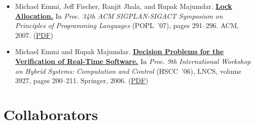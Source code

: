 \documentclass{article}
\begin{document}
\begin{itemize}[leftmargin=0cm,label={}]
    \item Michael Emmi, Jeff Fischer, Ranjit Jhala, and Rupak Majumdar. {\bf\href{%
    http://doi.acm.org/10.1145/1190216.1190260}{%
    Lock Allocation.}} In \emph{ Proc. 34th ACM SIGPLAN-SIGACT Symposium on Principles of Programming Languages } (POPL ’07), pages 291–296. ACM, 2007. (\href{https://michael-emmi.github.io/https://github.com/michael-emmi/research-papers/raw/master/conf-popl-EmmiFJM07.pdf}{PDF})


    \item Michael Emmi and Rupak Majumdar. {\bf\href{%
    http://dx.doi.org/10.1007/11730637_17}{%
    Decision Problems for the Verification of Real-Time Software.}} In \emph{ Proc. 9th International Workshop on Hybrid Systems: Computation and Control } (HSCC ’06), LNCS, volume 3927, pages 200–211. Springer, 2006. (\href{https://michael-emmi.github.io/https://github.com/michael-emmi/research-papers/raw/master/conf-hscc-EmmiM06.pdf}{PDF})

  \end{itemize}

  \section*{Collaborators}
\end{document}
